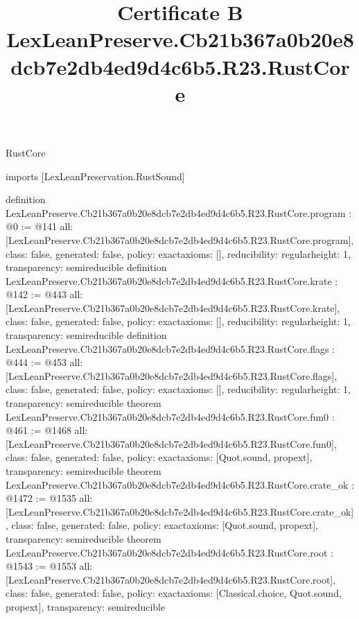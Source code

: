 \begin{lexlean}{RustCore}
\title{Certificate B LexLeanPreserve.Cb21b367a0b20e8dcb7e2db4ed9d4c6b5.R23.RustCore}
\begin{coremodule}
imports [LexLeanPreservation.RustSound]

definition LexLeanPreserve.Cb21b367a0b20e8dcb7e2db4ed9d4c6b5.R23.RustCore.program : @0 := @141 {
  all: [LexLeanPreserve.Cb21b367a0b20e8dcb7e2db4ed9d4c6b5.R23.RustCore.program],
  class: false,
  generated: false,
  policy: exact{axioms: []},
  reducibility: regular{height: 1},
  transparency: semireducible
}
definition LexLeanPreserve.Cb21b367a0b20e8dcb7e2db4ed9d4c6b5.R23.RustCore.krate : @142 := @443 {
  all: [LexLeanPreserve.Cb21b367a0b20e8dcb7e2db4ed9d4c6b5.R23.RustCore.krate],
  class: false,
  generated: false,
  policy: exact{axioms: []},
  reducibility: regular{height: 1},
  transparency: semireducible
}
definition LexLeanPreserve.Cb21b367a0b20e8dcb7e2db4ed9d4c6b5.R23.RustCore.flags : @444 := @453 {
  all: [LexLeanPreserve.Cb21b367a0b20e8dcb7e2db4ed9d4c6b5.R23.RustCore.flags],
  class: false,
  generated: false,
  policy: exact{axioms: []},
  reducibility: regular{height: 1},
  transparency: semireducible
}
theorem LexLeanPreserve.Cb21b367a0b20e8dcb7e2db4ed9d4c6b5.R23.RustCore.fun0 : @461 := @1468 {
  all: [LexLeanPreserve.Cb21b367a0b20e8dcb7e2db4ed9d4c6b5.R23.RustCore.fun0],
  class: false,
  generated: false,
  policy: exact{axioms: [Quot.sound, propext]},
  transparency: semireducible
}
theorem LexLeanPreserve.Cb21b367a0b20e8dcb7e2db4ed9d4c6b5.R23.RustCore.crate_ok : @1472 := @1535 {
  all: [LexLeanPreserve.Cb21b367a0b20e8dcb7e2db4ed9d4c6b5.R23.RustCore.crate_ok],
  class: false,
  generated: false,
  policy: exact{axioms: [Quot.sound, propext]},
  transparency: semireducible
}
theorem LexLeanPreserve.Cb21b367a0b20e8dcb7e2db4ed9d4c6b5.R23.RustCore.root : @1543 := @1553 {
  all: [LexLeanPreserve.Cb21b367a0b20e8dcb7e2db4ed9d4c6b5.R23.RustCore.root],
  class: false,
  generated: false,
  policy: exact{axioms: [Classical.choice, Quot.sound, propext]},
  transparency: semireducible
}


\end{coremodule}
\end{lexlean}
